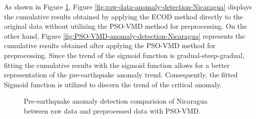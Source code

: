 \documentclass[3p,authoryear,preprint,12pt]{elsarticle}
\begin{document}
As shown in Figure \ref{fig:pre-earthquake-anomaly-detection-Nicaragua}, Figure \ref{fig:raw-data-anomaly-detection-Nicaragua} displays the cumulative results obtained by applying the ECOD method directly to {the original data} without utilizing the PSO-VMD method for preprocessing. On the other hand, Figure \ref{fig:PSO-VMD-anomaly-detection-Nicaragua} represents the cumulative results obtained after applying the PSO-VMD method for preprocessing. Since the trend of the {sigmoid function}\citep{oksumNovelApproachBased2021} is gradual-steep-gradual, fitting the cumulative results with the sigmoid function allows for a better representation of the pre-earthquake anomaly trend. Consequently, the fitted Sigmoid function is utilized to discern the trend of the critical anomaly.
\begin{figure}[htbp]
	\centering
	\caption{{Pre-earthquake anomaly detection comparision of Nicaragua between raw data and preprocessed data with PSO-VMD.}}
	\label{fig:pre-earthquake-anomaly-detection-Nicaragua}
\end{figure}
\end{document}
